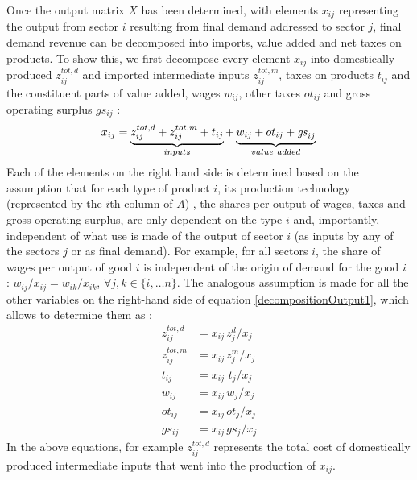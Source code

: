 \documentclass[12pt,english]{article}
\newcommand{\mli}[1]{\mathit{#1}}
\begin{document}
Once the output matrix $X$ has been determined, with elements $x_{ij}$ representing the output from sector $i$ resulting from final demand addressed to sector $j$, %
final demand revenue can be decomposed into imports, value added and net taxes on products. To show this, we first decompose every element $x_{ij}$ into domestically produced $z^{tot,d}_{ij}$ and imported intermediate inputs $z^{tot,m}_{ij}$, taxes on products $t_{ij}$ and the constituent parts of value added, wages $w_{ij}$, other taxes $ot_{ij}$ and gross operating surplus $gs_{ij}$ :   
\begin{equation}
x_{ij} = \underbrace{z^{tot,d}_{ij} + z^{tot,m}_{ij} + t_{ij}}_{inputs} + \underbrace{w_{ij} + ot_{ij} + \mli{gs}_{ij}}_{value\ added} \label{decompositionOutput1} \\
\end{equation}
Each of the elements on the right hand side is determined based on the assumption 
that for each type of product $i$, its production technology (represented by the $i$th column of $A$)%
, the shares per output of wages, taxes and gross operating surplus, are only dependent on the type $i$ and, importantly, independent of what use is made of the output of sector $i$ (as inputs by any of the sectors $j$ or as final demand). For example, for all sectors $i$, the share of wages per output of good $i$ is independent of the origin of demand for the good $i$ : $w_{ij}/x_{ij} = w_{ik}/x_{ik}$, $\forall j,k \in \{i, \dots n\}$. The analogous assumption is made for all the other variables on the right-hand side of equation \ref{decompositionOutput1}, %
which allows to determine them as : 
\begin{align}
z^{tot,d}_{ij} &= x_{ij} \, z^d_j/x_j \\
z^{tot,m}_{ij} &= x_{ij} \, z^m_j/x_j \label{totImports} \\
t_{ij} &= x_{ij} \, \, t_j/x_j \\
w_{ij} &= x_{ij} \, w_j/x_j \\
ot_{ij} &= x_{ij} \, ot_j/x_j \\
gs_{ij} &= x_{ij} \, gs_j/x_j
\end{align}
In the above equations, for example $z^{tot,d}_{ij}$ represents the total cost of domestically produced intermediate inputs that went into the production of $x_{ij}$. %
\end{document}
